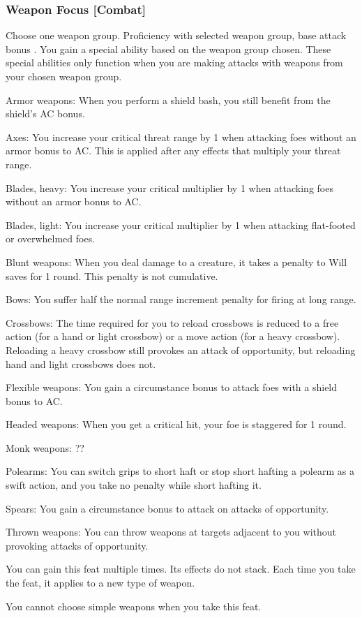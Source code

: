 \subsubsection{Weapon Focus [Combat]}
Choose one weapon group.
 Proficiency with selected weapon group, base attack bonus .
 You gain a special ability based on the weapon group chosen. These special abilities only function when you are making attacks with weapons from your chosen weapon group.
\begin{itemize*}
    \item Armor weapons: When you perform a shield bash, you still benefit from the shield's AC bonus.
    \item Axes: You increase your critical threat range by 1 when attacking foes without an armor bonus to AC. This is applied after any effects that multiply your threat range.
    \item Blades, heavy: You increase your critical multiplier by 1 when attacking foes without an armor bonus to AC.
    \item Blades, light: You increase your critical multiplier by 1 when attacking flat-footed or overwhelmed foes.
    \item Blunt weapons: When you deal damage to a creature, it takes a  penalty to Will saves for 1 round. This penalty is not cumulative.
    \item Bows: You suffer half the normal range increment penalty for firing at long range.
    \item Crossbows: The time required for you to reload crossbows is reduced to a free action (for a hand or light crossbow) or a move action (for a heavy crossbow). Reloading a heavy crossbow still provokes an attack of opportunity, but reloading hand and light crossbows does not.
    \item Flexible weapons: You gain a  circumstance bonus to attack foes with a shield bonus to AC.
    \item Headed weapons: When you get a critical hit, your foe is staggered for 1 round.
    \item Monk weapons: ??
    \item Polearms: You can switch grips to short haft or stop short hafting a polearm as a swift action, and you take no penalty while short hafting it.
    \item Spears: You gain a  circumstance bonus to attack on attacks of opportunity.
    \item Thrown weapons: You can throw weapons at targets adjacent to you without provoking attacks of opportunity.
\end{itemize*}
 You can gain this feat multiple times. Its effects do not stack. Each time you take the feat, it applies to a new type of weapon.
\par You cannot choose simple weapons when you take this feat.

